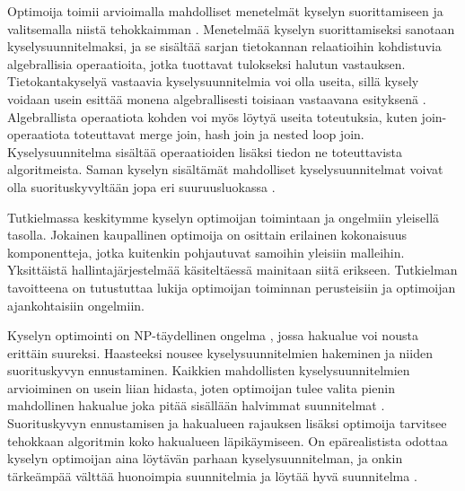 \documentclass[finnish]{tktltiki2}
\theoremstyle{definition}
\theoremstyle{remark}
\begin{document}
Optimoija toimii arvioimalla mahdolliset menetelmät kyselyn suorittamiseen ja valitsemalla niistä tehokkaimman \cite{selinger1979access}. Menetelmää kyselyn suorittamiseksi sanotaan kyselysuunnitelmaksi, ja se sisältää sarjan tietokannan relaatioihin kohdistuvia algebrallisia operaatioita, jotka tuottavat tulokseksi halutun vastauksen. Tietokantakyselyä vastaavia kyselysuunnitelmia voi olla useita, sillä kysely voidaan usein esittää monena algebrallisesti toisiaan vastaavana esityksenä \cite{jarke1984}. Algebrallista operaatiota kohden voi myös löytyä useita toteutuksia, kuten join-operaatiota toteuttavat merge join, hash join ja nested loop join. Kyselysuunnitelma sisältää operaatioiden lisäksi tiedon ne toteuttavista algoritmeista. Saman kyselyn sisältämät mahdolliset kyselysuunnitelmat voivat olla suorituskyvyltään jopa eri suuruusluokassa \cite{ioannidis1996query, oracle2013refman}. 


Tutkielmassa keskitymme kyselyn optimoijan toimintaan ja ongelmiin yleisellä tasolla. Jokainen kaupallinen optimoija on osittain erilainen kokonaisuus komponentteja, jotka kuitenkin pohjautuvat samoihin yleisiin malleihin. Yksittäistä hallintajärjestelmää käsiteltäessä mainitaan siitä erikseen. Tutkielman tavoitteena on tutustuttaa lukija optimoijan toiminnan perusteisiin ja optimoijan ajankohtaisiin ongelmiin.

Kyselyn optimointi on NP-täydellinen ongelma \cite{ibaraki1984optimal}, jossa hakualue voi nousta erittäin suureksi. Haasteeksi nousee kyselysuunnitelmien hakeminen ja niiden suorituskyvyn ennustaminen. Kaikkien mahdollisten kyselysuunnitelmien arvioiminen on usein liian hidasta, joten optimoijan tulee valita pienin mahdollinen hakualue joka pitää sisällään halvimmat suunnitelmat \cite{chaudhuri1998}. Suorituskyvyn ennustamisen ja hakualueen rajauksen lisäksi optimoija tarvitsee tehokkaan algoritmin koko hakualueen läpikäymiseen. On epärealistista odottaa kyselyn optimoijan aina löytävän parhaan kyselysuunnitelman, ja onkin tärkeämpää välttää huonoimpia suunnitelmia ja löytää hyvä suunnitelma \cite{ramakrishnan2003database}. 
\end{document}
